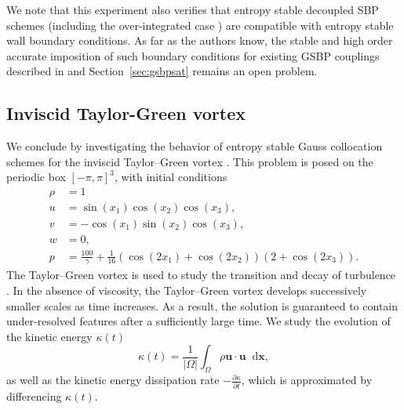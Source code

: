 \documentclass[review,onefignum,onetabnum,final]{siamart171218}
\newcommand{\pd}[2]{\frac{\partial#1}{\partial#2}}
\newcommand{\LRp}[1]{\left( #1 \right)}
\newcommand{\LRb}[1]{\left| #1 \right|}
\newcommand*\diff[1]{\mathop{}\!{\mathrm{d}#1}}
\begin{document}
We note that this experiment also verifies that entropy stable decoupled SBP schemes (including the over-integrated case \cite{chan2017discretely}) are compatible with entropy stable wall boundary conditions.  As far as the authors know, the stable and high order accurate imposition of such boundary conditions for existing GSBP couplings described in \cite{crean2017high} and Section~\ref{sec:gsbpsat} remains an open problem.  

\subsection{Inviscid Taylor-Green vortex}

We conclude by investigating the behavior of entropy stable Gauss collocation schemes for the inviscid Taylor--Green vortex \cite{ae1937mechanism, gassner2016split, crean2018entropy}.  This problem is posed on the periodic box $[-\pi,\pi]^3$, with initial conditions 
\begin{align*}
\rho &= 1\\
u &= \sin(x_1)\cos(x_2)\cos(x_3),\\
v &= -\cos(x_1)\sin(x_2)\cos(x_3),\\ 
w &= 0,\\
p &= \frac{100}{\gamma} + \frac{1}{16} \LRp{\cos(2x_1) + \cos(2x_2)}\LRp{2+\cos(2x_3)}.
\end{align*}
The Taylor--Green vortex is used to study the transition and decay of turbulence \cite{debonis2013solutions}.  In the absence of viscosity, the Taylor--Green vortex develops successively smaller scales as time increases.  As a result, the solution is guaranteed to contain under-resolved features after a sufficiently large time.  We study the evolution of the kinetic energy $\kappa(t)$ 
\[
\kappa(t) =\frac{1}{\LRb{\Omega}} \int_{\Omega} \rho \bm{u}\cdot\bm{u} \diff{\bm{x}},
\]
as well as the kinetic energy dissipation rate $-\pd{\kappa}{t}$, which is approximated by differencing $\kappa(t)$.  
\end{document}
